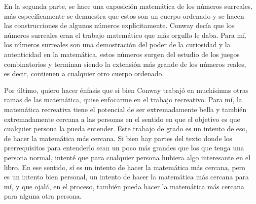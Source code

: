 En la segunda parte, se hace una exposici\'on matem\'atica de los n\'umeros surreales, m\'as espec\'ificamente se demuestra que estos son un cuerpo ordenado y se hacen las construcciones de algunos n\'umeros expl\'icitamente. Conway dec\'ia que los n\'umeros surreales eran el trabajo matem\'atico que m\'as orgullo le daba. Para m\'i, los n\'umeros surreales son una demostraci\'on del poder de la curiosidad y la autenticidad en la matem\'atica, estos n\'umeros surgen del estudio de los juegos combinatorios y terminan siendo la extensi\'on m\'as grande de los n\'umeros reales, es decir, contienen a cualquier otro cuerpo ordenado.

Por \'ultimo, quiero hacer \'enfasis que si bien Conway trabaj\'o en much\'isimas otras ramas de las matem\'atica, quise enfocarme en el trabajo recreativo. Para m\'i, la matem\'atica recreativa tiene el potencial de ser extremadamente bella y tambi\'en extremadamente cercana a las personas en el sentido en que el objetivo es que cualquier persona la pueda entender. Este trabajo de grado es un intento de eso, de hacer la matem\'atica m\'as cercana. Si bien hay partes del texto donde los prerrequisitos para entenderlo sean un poco m\'as grandes que los que tenga una persona normal, intent\'e que para cualquier persona hubiera algo interesante en el libro. En ese sentido, s\'i es un intento de hacer la matem\'atica m\'as cercana, pero es un intento bien personal, un intento de hacer la matem\'atica m\'as cercana para m\'i, y que ojal\'a, en el proceso, tambi\'en pueda hacer la matem\'atica m\'as cercana para alguna otra persona.